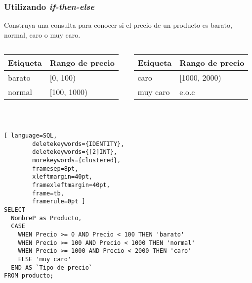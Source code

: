 
\begin{frame}[fragile]
	
	\frametitle{Utilizando \emph{if-then-else}}
	
	Construya una consulta para conocer si el precio de un producto es barato, normal, caro o muy caro. 
	
	\begin{columns}[t]
		\begin{table}[]
			\begin{tabular}{|l|l|}
				\hline
				Etiqueta & Rango de precio \\ \hline \hline
				barato   & {[}0, 100)        \\ \hline
				normal   & {[}100, 1000)       \\ \hline
			\end{tabular}
		\end{table}
		
		
		\begin{table}[]
			\begin{tabular}{|l|l|}
				\hline
				Etiqueta   & Rango de precio \\ \hline \hline
				caro          & {[}1000, 2000)        \\ \hline
				muy caro & e.o.c       \\ \hline
			\end{tabular}
		\end{table}
		
	\end{columns}
	
	\pause
	
	\ 
	
	\begin{lstlisting}[ language=SQL,
		deletekeywords={IDENTITY},
		deletekeywords={[2]INT},
		morekeywords={clustered},
		framesep=8pt,
		xleftmargin=40pt,
		framexleftmargin=40pt,
		frame=tb,
		framerule=0pt ]
SELECT 
  NombreP as Producto, 
  CASE 
    WHEN Precio >= 0 AND Precio < 100 THEN 'barato'
    WHEN Precio >= 100 AND Precio < 1000 THEN 'normal'
    WHEN Precio >= 1000 AND Precio < 2000 THEN 'caro'
    ELSE 'muy caro'
  END AS `Tipo de precio`
FROM producto;
\end{lstlisting}
	
\end{frame}


